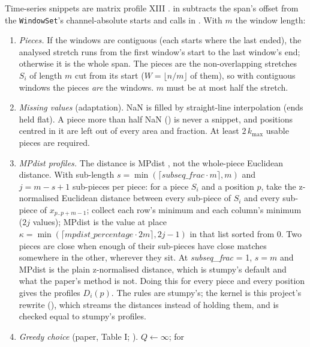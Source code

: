 Time-series snippets are matrix profile XIII \citep{imani2018matrix}.  in
 subtracts the span's offset from the \texttt{WindowSet}'s
channel-absolute starts and calls  in
. With $m$ the window length:
\begin{enumerate}
\item \emph{Pieces.} If the windows are contiguous (each starts where the last ended), the analysed
  stretch runs from the first window's start to the last window's end; otherwise it is the whole
  span. The pieces are the non-overlapping stretches $S_i$ of length $m$ cut from its start
  ($W = \lfloor n/m \rfloor$ of them), so with contiguous windows the pieces \emph{are} the windows.
  $m$ must be at most half the stretch.
\item \emph{Missing values} (adaptation). NaN is filled by straight-line interpolation (ends held
  flat). A piece more than half NaN () is never a snippet, and positions
  centred in it are left out of every area and fraction. At least $2\,k_{\max}$ usable pieces are
  required.
\item \emph{MPdist profiles.} The distance is MPdist \citep{gharghabi2018matrix}, not the
  whole-piece Euclidean distance. With sub-length $s = \min(\lceil \textit{subseq\_frac}\cdot
  m\rceil, m)$ and $j = m - s + 1$ sub-pieces per piece: for a piece $S_i$ and a position $p$, take
  the z-normalised Euclidean distance between every sub-piece of $S_i$ and every sub-piece of
  $x_{p..p+m-1}$; collect each row's minimum and each column's minimum ($2j$ values); MPdist is
  the value at place $\kappa = \min(\lceil \textit{mpdist\_percentage}\cdot 2m\rceil, 2j - 1)$ in
  that list sorted from 0. Two pieces are close when enough of their sub-pieces have close matches
  somewhere in the other, wherever they sit. At \emph{subseq\_frac} = 1, $s = m$ and MPdist is
  the plain z-normalised distance, which is stumpy's default and what the paper's method is not.
  Doing this for every piece and every position gives the profiles $D_i(p)$. The rules are
  stumpy's; the kernel is this project's rewrite (), which streams the
  distances instead of holding them, and is checked equal to stumpy's profiles.
\item \emph{Greedy choice} (paper, Table I; ). $Q \gets \infty$; for

\end{enumerate}
